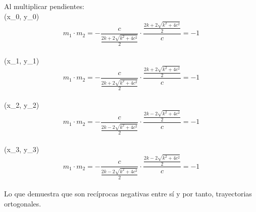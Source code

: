 \documentclass[12pt]{article}
\begin{document}
Al multiplicar pendientes:\\
(x_0, y_0)\\
\[
  m_1 \cdot m_2 = -\frac{c}{ \frac{2k+2\sqrt{k^2+4c^2}}{2} }    \cdot  \frac {  \frac {2k+2\sqrt{k^2+4c^2}}  {2}  }{ c} = -1
 \] \\
(x_1, y_1)\\
\[
  m_1 \cdot m_2 = - \frac {c}{ \frac {2k+2\sqrt{k^2+4c^2}} {2}} \cdot \frac {  \frac {2k+2\sqrt{k^2+4c^2}}  {2}  } {c} =- 1
\]\\
(x_2, y_2)\\
\[
  m_1 \cdot m_2 = -\frac {c}{ \frac {2k-2\sqrt{k^2+4c^2}} {2}} \cdot \frac {  \frac {2k-2\sqrt{k^2+4c^2}}  {2}  } {c} = -1
  \]\\
(x_3, y_3)\\
\[
  m_1 \cdot m_2 =  - \frac {c}{ \frac {2k-2\sqrt{k^2+4c^2}} {2}} \cdot   \frac {  \frac {2k-2\sqrt{k^2+4c^2}}  {2}  } {c} = -1
  \]\\
Lo que demuestra que son recíprocas negativas entre sí y por tanto, trayectorias ortogonales.
\end{document}
